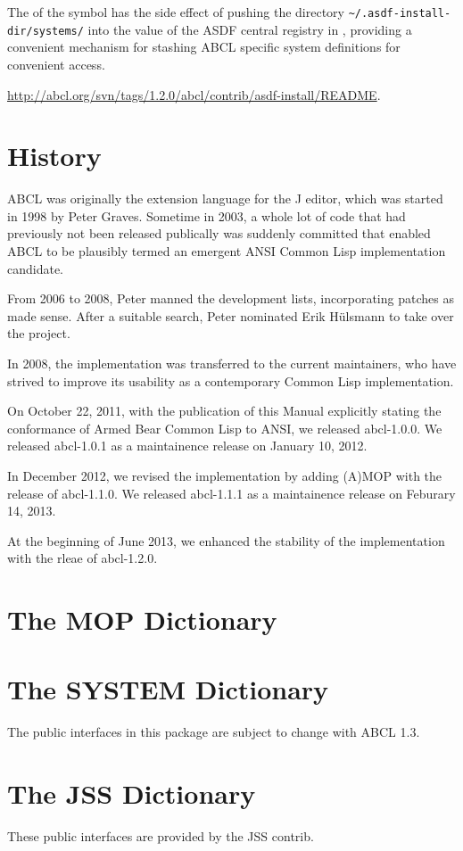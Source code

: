 \documentclass[10pt]{book}
\begin{document}
The  of the  symbol has the side
effect of pushing the directory \verb+~/.asdf-install-dir/systems/+ into
the value of the \textsc{ASDF} central registry in
, providing a convenient mechanism for
stashing \textsc{ABCL} specific system definitions for convenient
access.

\url{http://abcl.org/svn/tags/1.2.0/abcl/contrib/asdf-install/README}.


\chapter{History}

\textsc{ABCL} was originally the extension language for the J editor, which was
started in 1998 by Peter Graves.  Sometime in 2003, a whole lot of
code that had previously not been released publically was suddenly
committed that enabled ABCL to be plausibly termed an emergent ANSI
Common Lisp implementation candidate.

From 2006 to 2008, Peter manned the development lists, incorporating
patches as made sense.  After a suitable search, Peter nominated Erik
H\"{u}lsmann to take over the project.

In 2008, the implementation was transferred to the current
maintainers, who have strived to improve its usability as a
contemporary Common Lisp implementation.

On October 22, 2011, with the publication of this Manual explicitly
stating the conformance of Armed Bear Common Lisp to \textsc{ANSI}, we
released abcl-1.0.0.  We released abcl-1.0.1 as a maintainence release
on January 10, 2012.

In December 2012, we revised the implementation by adding
\textsc{(A)MOP} with the release of abcl-1.1.0.  We released
abcl-1.1.1 as a maintainence release on Feburary 14, 2013.

At the beginning of June 2013, we enhanced the stability of the
implementation with the rleae of abcl-1.2.0.

\appendix 

\chapter{The MOP Dictionary}



\chapter{The SYSTEM Dictionary}

The public interfaces in this package are subject to change with
\textsc{ABCL} 1.3.



\chapter{The JSS Dictionary}

These public interfaces are provided by the JSS contrib.






\printindex
\end{document}
